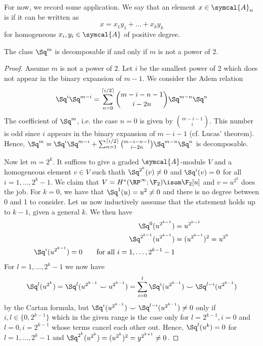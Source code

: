 For now, we record some application.
We say that an element $x \in \symcal{A}_n$ is  if it can be written as
\begin{equation*}
	x = x_1 y_1 + \ldots + x_k y_k
\end{equation*}
for homogeneous $x_i, y_i \in \symcal{A}$ of positive degree.
\begin{lemma}
	The class $\Sq^m$ is decomposable if and only if $m$ is not a power of 2.
\end{lemma}
\begin{proof}
	Assume $m$ is not a power of 2.
	Let $i$ be the smallest power of 2 which does not appear in the binary expansion of $m - 1$.
	We consider the Adem relation
	\begin{equation*}
		\Sq^i \Sq^{m - i} = \sum_{n = 0}^{\lceil i / 2\rceil} \binom{m - i - n - 1}{i - 2n} \Sq^{m - n} \Sq^n
	\end{equation*}
	The coefficient of $\Sq^m$, i.e. the case $n = 0$ is given by $\binom{m - i -1}{i}$.
	This number is odd since $i$ appears in the binary expansion of $m - i - 1$ (cf. Lucas' theorem). %
	Hence, $\Sq^m = \Sq^i \Sq^{m - i} + \sum_{n = 1}^{\lceil i / 2\rceil} \binom{m - i - n - 1}{i - 2n} \Sq^{m - n} \Sq^n$ is decomposable.

	Now let $m = 2^k$.
	It suffices to give a graded $\symcal{A}$-module $V$ and a homogeneous element $v \in V$ such thath $\Sq^{2^k}(v) \neq 0$ and $\Sq^i(v) = 0$ for all $i = 1, \ldots, 2^k - 1$.
	We claim that $V = H^*(\RP^\infty; \F_2) \isom \F_2[u]$ and $v = u^{2^k}$ does the job.
	For $k = 0$, we have that $\Sq^1(u) = u^2 \neq 0$ and there is no degree between 0 and 1 to consider.
	Let us now inductively asssume that the statement holds up to $k - 1$, given a general $k$.
	We then have
	\begin{align*}
		\Sq^0(u^{2^{k - 1}}) &= u^{2^{k - 1}} \\
		\Sq^{2^{k - 1}}(u^{2^{k - 1}}) &= (u^{2^{k - 1}})^2 = u^{2^k} \\
		\Sq^i(u^{2^{k - 1}}) = 0 \qquad\text{for all } i = 1, \ldots, 2^{k - 1} - 1
	\end{align*}
	For $l = 1, \ldots, 2^k - 1$ we now have
	\begin{equation*}
		\Sq^l(u^{2^k}) = \Sq^l(u^{2^{k - 1}} \smile u^{2^{k - 1}}) = \sum_{i = 0}^l \Sq^i(u^{2^{k - 1}}) \smile \Sq^{l - i}(u^{2^{k - 1}})
	\end{equation*}
	by the Cartan formula, but $\Sq^i(u^{2^{k - 1}}) \smile \Sq^{l - i}(u^{2^{k - 1}}) \neq 0$ only if $i, l \in \{0, 2^{k - 1}\}$ which in the given range is the case only for $l = 2^{k - 1}, i = 0$ and $l = 0, i = 2^{k - 1}$ whose terms cancel each other out.
	Hence, $\Sq^l(u^k) = 0$ for $l = 1, \ldots, 2^k - 1$ and $\Sq^{2^k}(u^{2^k}) = (u^{2^k})^2 = y^{2^{k + 1}} \neq 0$.
\end{proof}
